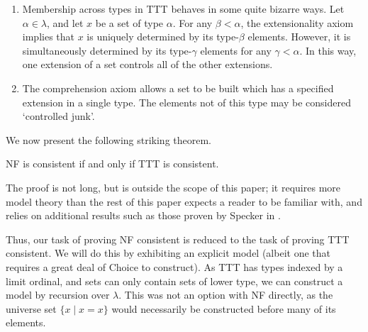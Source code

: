 \begin{remarks}
	\begin{enumerate}
		\item Membership across types in TTT behaves in some quite bizarre ways.
		Let \( \alpha \in \lambda \), and let \( x \) be a set of type \( \alpha \).
		For any \( \beta < \alpha \), the extensionality axiom implies that \( x \) is uniquely determined by its type-\( \beta \) elements.
		However, it is simultaneously determined by its type-\( \gamma \) elements for any \( \gamma < \alpha \).
		In this way, one extension of a set controls all of the other extensions.
		\item The comprehension axiom allows a set to be built which has a specified extension in a single type.
		The elements not of this type may be considered `controlled junk'.
	\end{enumerate}
\end{remarks}

We now present the following striking theorem.

\begin{theorem}[Holmes]
	NF is consistent if and only if TTT is consistent.
\end{theorem}

The proof is not long, but is outside the scope of this paper; it requires more model theory than the rest of this paper expects a reader to be familiar with, and relies on additional results such as those proven by Specker in \cite{typical-ambiguity}.

Thus, our task of proving NF consistent is reduced to the task of proving TTT consistent.
We will do this by exhibiting an explicit model (albeit one that requires a great deal of Choice to construct).
As TTT has types indexed by a limit ordinal, and sets can only contain sets of lower type, we can construct a model by recursion over \( \lambda \).
This was not an option with NF directly, as the universe set \( \{ x \mid x = x \} \) would necessarily be constructed before many of its elements.
